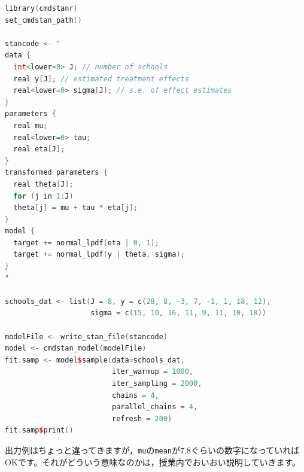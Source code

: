 \documentclass{ltjsbook}
\begin{document}
\begin{lstlisting}[language=c++,label={code::App2},caption={cmdstanrパッケージの起動確認}]
library(cmdstanr)
set_cmdstan_path()

stancode <- "
data {
  int<lower=0> J; // number of schools 
  real y[J]; // estimated treatment effects
  real<lower=0> sigma[J]; // s.e. of effect estimates 
}
parameters {
  real mu; 
  real<lower=0> tau;
  real eta[J];
}
transformed parameters {
  real theta[J];
  for (j in 1:J)
  theta[j] = mu + tau * eta[j];
}
model {
  target += normal_lpdf(eta | 0, 1);
  target += normal_lpdf(y | theta, sigma);
}
"

schools_dat <- list(J = 8, y = c(28, 8, -3, 7, -1, 1, 18, 12), 
                    sigma = c(15, 10, 16, 11, 9, 11, 10, 18))

modelFile <- write_stan_file(stancode)
model <- cmdstan_model(modelFile)
fit.samp <- model$sample(data=schools_dat,
                         iter_warmup = 1000,
                         iter_sampling = 2000,
                         chains = 4,
                         parallel_chains = 4,
                         refresh = 200)
fit.samp$print()
\end{lstlisting}

出力例はちょっと違ってきますが，\texttt{mu}の\texttt{mean}が7.8ぐらいの数字になっていればOKです。それがどういう意味なのかは，授業内でおいおい説明していきます。
\end{document}
